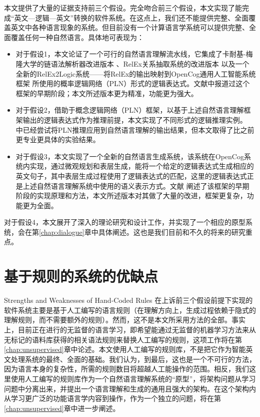 本文提供了大量的证据支持前三个假设。完全吻合前三个假设，本文实现了能完成“英文—逻辑—英文”转换的软件系统。在这点上，我们还不能提供完整、全面覆盖英文中各种语言现象的系统。但目前没有一个计算语言学系统可以提供完整、全面覆盖任何一种自然语言。具体地可表现为：
\begin{itemize}
\item 对于假设1，本文论证了一个可行的自然语言理解流水线，它集成了卡耐基-梅隆大学的链语法解析器改进版本 \cite{Sleator1993}、RelEx关系抽取系统\cite{Goertzel2006}的改进版本 以及一个全新的RelEx2Logic系统——将RelEx的输出映射到OpenCog通用人工智能系统框架 \cite{EGI1}\cite{EGI2}所使用的概率逻辑网络（PLN）形式的逻辑表达式。文献\cite{Lian2012}中报道过这个框架的早期阶段；本文所述版本更为精准，功能更为强大。
\item 对于假设2，借助于概念逻辑网络（PLN）框架，以基于上述自然语言理解框架输出的逻辑表达式作为推理前提，本文实现了不同形式的逻辑推理实例。
 \cite{Goertzel2006}中已经尝试将PLN推理应用到自然语言理解的输出结果，但本文取得了比之前更专业更具体的实验结果。
\item 对于假设3，本文实现了一个全新的自然语言生成系统，该系统在OpenCog系统内实现，通过微观规划和表层生成，能将一个给定的逻辑表达式生成相应的英文句子，其中表层生成过程使用了逻辑表达式的匹配，这里的逻辑表达式正是上述自然语言理解系统中使用的语义表示方式。文献 \cite{Lian2010}阐述了该框架的早期阶段的实现原理和方法，本文所述版本对其做了大量的改进，框架更复杂，功能更为全面。

\end{itemize}
\noindent 对于假设4，本文展开了深入的理论研究和设计工作，并实现了一个相应的原型系统，会在第\ref{chap:dialogue}章中具体阐述。这也是我们目前和不久的将来的研究重点。


\section{基于规则的系统的优缺点}{Strengths and Weaknesses of Hand-Coded Rules}
在上诉前三个假设前提下实现的软件系统主要是基于人工编写的语言规则（在理解方向上，生成过程依赖于隐式的理解规则，而不需要额外的规则）。然而，这不是本文所采用方法的全部。事实上，目前正在进行的无监督的语言学习，即希望能通过无监督的机器学习方法来从无标记的语料库获得的相关语法规则来替换人工编写的规则，这项工作将在第\ref{chap:unsupervised}章中论述。本文使用人工编写的规则库，不是把它作为智能英文处理系统的最终、全面的基础。我们认为，到最后，这也是一个不可行的方法，因为语言本身的复杂性，所需的规则数目将超越人工能操作的范围。相反，我们这里使用人工编写的规则库作为一个自然语言理解系统的“原型”，将架构问题从学习问题中分离出来，并提出一个语言理解和生成的通用且强大的架构。在这个架构内从学习更广泛的功能语言学内容到操作，作为一个独立的问题，将在第\ref{chap:unsupervised}章中进一步阐述。

